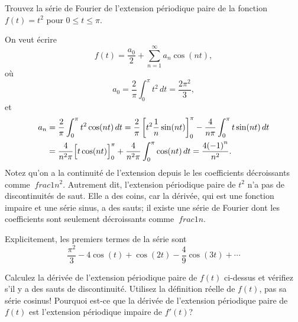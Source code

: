 
\begin{example}
Trouvez la série de Fourier de l'extension périodique paire de
la fonction $f(t) = t^2$ pour $0 \leq t \leq \pi$.

On veut écrire
\begin{equation*}
f(t) = \frac{a_0}{2} + \sum_{n=1}^\infty a_n \cos (n t) ,
\end{equation*}
où
\begin{equation*}
a_0 = \frac{2}{\pi}
\int_0^\pi t^2 \, dt = \frac{2 \pi^2}{3} ,
\end{equation*}
et
\begin{equation*}
\begin{split}
a_n & = \frac{2}{\pi}
\int_0^\pi t^2 \cos (n t) \, dt
= \frac{2}{\pi} \left[ t^2 \frac{1}{n} \sin (nt) \right]_0^\pi -
\frac{4}{n\pi}
\int_0^\pi t \sin (n t) \, dt \\
& = 
\frac{4}{n^2\pi}
\Bigl[ t \cos (n t) \Bigr]_0^\pi
+
\frac{4}{n^2\pi}
\int_0^\pi \cos (n t) \, dt
= 
\frac{4{(-1)}^n}{n^2} .
\end{split}
\end{equation*}
Notez qu'on a  la continuité de l'extension depuis le
les coefficients décroissants comme $ \ frac {1} {n ^ 2} $. Autrement dit, l'extension périodique paire
de $ t ^ 2 $ n'a pas de discontinuités de saut. Elle a des coins, car
la dérivée, qui est une fonction impaire et une série sinus, a des sauts; il existe
une série de Fourier dont les coefficients sont seulement décroissants comme $ \ frac {1} {n} $. 

Explicitement, les premiers termes de la série sont
\begin{equation*}
\frac{\pi^2}{3} - 4 \cos (t) + \cos (2t) - \frac{4}{9} \cos (3t) + \cdots
\end{equation*}
\end{example}

\begin{exercise}
\leavevmode
\begin{tasks}
\task Calculez la dérivée de l'extension périodique paire de $ f (t) $ ci-dessus et vérifiez s'il y a des sauts de discontinuité. Utilisez la définition réelle de $ f (t) $, pas sa série cosinus!
\task Pourquoi est-ce que la dérivée de l'extension périodique paire de $ f (t) $ est l'extension périodique impaire de $ f '(t) $?
\end{tasks}
\end{exercise}


